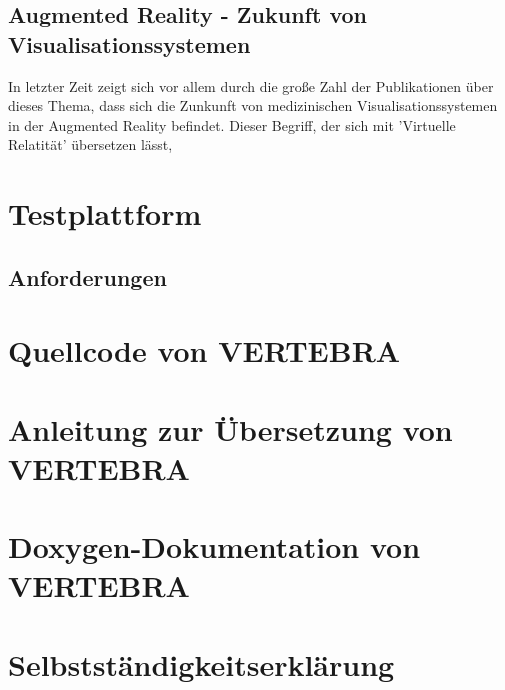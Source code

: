 \documentclass[a4paper]{scrartcl}
\begin{document}
\subsection{Augmented Reality - Zukunft von Visualisationssystemen}\label{sec:augmentedreality}
In letzter Zeit zeigt sich vor allem durch die große Zahl der Publikationen über dieses Thema, dass sich die Zunkunft von medizinischen
Visualisationssystemen in der Augmented Reality befindet. Dieser Begriff, der sich mit 'Virtuelle Relatität' übersetzen lässt, \cite{Botden2009}
\appendix \label{appendixstart}
\section{Testplattform}\newpage\newpage\newpage
\subsection{Anforderungen}\label{ssec:requirements}
\section{Quellcode von VERTEBRA}
\section{Anleitung zur Übersetzung von VERTEBRA}
\section{Doxygen-Dokumentation von VERTEBRA}
\section{Selbstständigkeitserklärung}


\end{document}
